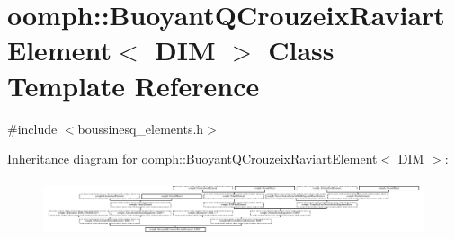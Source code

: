 \hypertarget{classoomph_1_1BuoyantQCrouzeixRaviartElement}{}\section{oomph\+:\+:Buoyant\+Q\+Crouzeix\+Raviart\+Element$<$ D\+IM $>$ Class Template Reference}
\label{classoomph_1_1BuoyantQCrouzeixRaviartElement}


{\ttfamily \#include $<$boussinesq\+\_\+elements.\+h$>$}

Inheritance diagram for oomph\+:\+:Buoyant\+Q\+Crouzeix\+Raviart\+Element$<$ D\+IM $>$\+:\begin{figure}[H]
\begin{center}
\leavevmode
\includegraphics[height=1.671642cm]{classoomph_1_1BuoyantQCrouzeixRaviartElement}
\end{center}
\end{figure}
